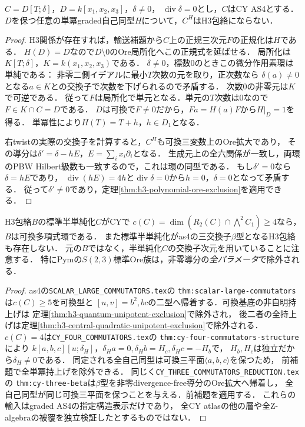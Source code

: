 \begin{lemma}
\label{lem:h3-ore-unipotent-exclusion}
$C=D[T;\delta]$，$D=k[x_1,x_2,x_3]$，$\delta\ne0$，
$\operatorname{div}\delta=0$とし，$C$はCY AS4とする．
$D$を保つ任意の単冪graded自己同型$H$について，$C^H$はH3包絡にならない．
\end{lemma}
\begin{proof}
H3関係が存在すれば，輸送補題から$C$上の正規三次元$F$の正規化は$H$である．
$H(D)=D$なので$D\setminus0$のOre局所化へこの正規式を延ばせる．
局所化は$K[T;\delta]$，$K=k(x_1,x_2,x_3)$である．
$\delta\ne0$，標数0のときこの微分作用素環は単純である：
非零二側イデアルに最小$T$次数の元を取り，正次数なら
$\delta(a)\ne0$となる$a\in K$との交換子で次数を下げられるので矛盾する．
次数0の非零元は$K$で可逆である．
従って$F$は局所化で単元となる．単元の$T$次数は0なので$F\in K\cap C=D$である．
$D$は可換で$F\ne0$だから，$Fa=H(a)F$から$H|_D=1$を得る．
単冪性により$H(T)=T+h$，$h\in D_1$となる．

右twistの実際の交換子を計算すると，$C^H$も可換三変数上のOre拡大であり，
その導分は$\delta'=\delta-hE$，$E=\sum_i x_i\partial_i$となる．
生成元上の全六関係が一致し，両環のPBW Hilbert級数も一致するので，これは環の同型である．
もし$\delta'=0$なら$\delta=hE$であり，
$\operatorname{div}(hE)=4h$と$\operatorname{div}\delta=0$から$h=0$，$\delta=0$となって矛盾する．
従って$\delta'\ne0$であり，定理\ref{thm:h3-polynomial-ore-exclusion}を適用できる．
\end{proof}

\begin{corollary}
\label{cor:h3-cy-commutator-reduction}
H3包絡$B$の標準半単純化$C$がCYで
$c(C)=\dim(R_2(C)\cap\bigwedge^2C_1)\ge4$なら，$B$は可換多項式環である．
また標準半単純化がas4の三交換子$\beta$型となるH3包絡も存在しない．
元の$B$ではなく，半単純化$C$の交換子次元を用いていることに注意する．
特にPymの$S(2,3)$標準Ore族は，非零導分の\emph{全パラメータ}で除外される．
\end{corollary}
\begin{proof}
as4の\texttt{SCALAR\_LARGE\_COMMUTATORS.tex}の
\texttt{thm:scalar-large-commutators}は$c(C)\ge5$を可換型と
$[u,v]=b^2,bc$の二型へ帰着する．可換基底の非自明持上げは
定理\ref{thm:h3-quantum-unipotent-exclusion}で除外され，
後二者の全持上げは定理\ref{thm:h3-central-quadratic-unipotent-exclusion}で除外される．
$c(C)=4$は\texttt{CY\_FOUR\_COMMUTATORS.tex}の
\texttt{thm:cy-four-commutators-structure}により
$k[a,b,c][u;\delta_H]$，$\delta_Ha=0,\delta_Hb=H_c,\delta_Hc=-H_b$で，
$H_b,H_c$は独立だから$\delta_H\ne0$である．
同定される全自己同型は可換三平面$\langle a,b,c\rangle$を保つため，
前補題で全単冪持上げを除外できる．
同じく\texttt{CY\_THREE\_COMMUTATORS\_REDUCTION.tex}の
\texttt{thm:cy-three-beta}は$\beta$型を非零divergence-free導分のOre拡大へ帰着し，
全自己同型が同じ可換三平面を保つことを与える．前補題を適用する．
これらの輸入はgraded AS4の指定構造表示だけであり，
全CY atlasの他の層や全Z-algebraの被覆を独立検証したとするものではない．
\end{proof}

